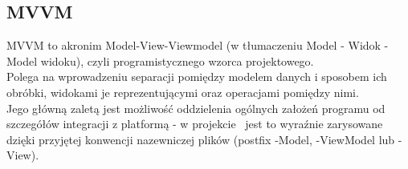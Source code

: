 \subsection{MVVM} \label{mvvmSubsection}
MVVM to akronim Model-View-Viewmodel (w tłumaczeniu Model - Widok - Model widoku), czyli programistycznego wzorca projektowego. \\
Polega na wprowadzeniu separacji pomiędzy modelem danych i sposobem ich obróbki, widokami je reprezentującymi oraz operacjami pomiędzy nimi. \\
Jego główną zaletą jest możliwość oddzielenia ogólnych założeń programu od szczegółów integracji z platformą 
- w projekcie~\cite{Halaczkiewicz_Navigator_GitHub} jest to wyraźnie zarysowane dzięki przyjętej 
konwencji nazewniczej plików (postfix -Model, -ViewModel lub -View).
            
